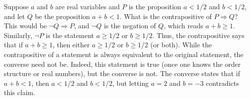         \begin{example}
            Suppose $a$ and $b$ are real variables and $P$ is the proposition
            $a<1/2$ and $b<1/2$, and let $Q$ be the proposition $a+b<1$.
            What is the contrapositive of $P\Rightarrow{Q}$? This would be
            $\neg{Q}\Rightarrow{P}$, and $\neg{Q}$ is the negation of $Q$, which
            reads $a+b\geq{1}$. Similarly, $\neg{P}$ is the statement
            $a\geq{1}/2$ or $b\geq{1}/2$. Thus, the contrapositive says that if
            $a+b\geq{1}$, then either $a\geq{1}/2$ or $b\geq{1}/2$ (or both).
            While the contrapositive of a statement is always equivalent to the
            original statement, the converse need not be. Indeed, this statement
            is true (once one knows the order structure or real numbers), but
            the converse is not. The converse states that if $a+b<1$, then
            $a<1/2$ and $b<1/2$, but letting $a=2$ and $b=\minus{3}$
            contradicts this claim.
        \end{example}
